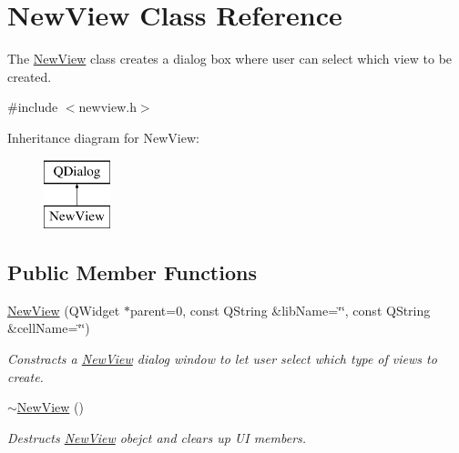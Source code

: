 \hypertarget{classNewView}{\section{New\-View Class Reference}
\label{classNewView}
}


The \hyperlink{classNewView}{New\-View} class creates a dialog box where user can select which view to be created.  




{\ttfamily \#include $<$newview.\-h$>$}

Inheritance diagram for New\-View\-:\begin{figure}[H]
\begin{center}
\leavevmode
\includegraphics[height=2.000000cm]{classNewView}
\end{center}
\end{figure}
\subsection*{Public Member Functions}
\begin{DoxyCompactItemize}
\item 
\hyperlink{classNewView_adf346776d2dbb084ffd8fae4239d85f3}{New\-View} (Q\-Widget $\ast$parent=0, const Q\-String \&lib\-Name=\char`\"{}\char`\"{}, const Q\-String \&cell\-Name=\char`\"{}\char`\"{})
\begin{DoxyCompactList}\small\item\em Constracts a \hyperlink{classNewView}{New\-View} dialog window to let user select which type of views to create. \end{DoxyCompactList}\item 
\hyperlink{classNewView_ab2bb30c39ce51c8a246dcdeb5c72ef72}{$\sim$\-New\-View} ()
\begin{DoxyCompactList}\small\item\em Destructs \hyperlink{classNewView}{New\-View} obejct and clears up U\-I members. \end{DoxyCompactList}\end{DoxyCompactItemize}

